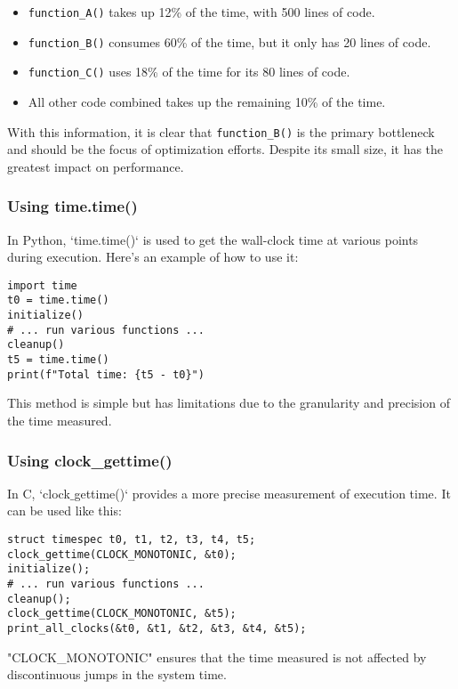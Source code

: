 \documentclass[12pt]{article}
\begin{document}
\begin{itemize}
    \item \texttt{function\_A()} takes up 12\% of the time, with 500 lines of code.
    \item \texttt{function\_B()} consumes 60\% of the time, but it only has 20 lines of code.
    \item \texttt{function\_C()} uses 18\% of the time for its 80 lines of code.
    \item All other code combined takes up the remaining 10\% of the time.
\end{itemize}

With this information, it is clear that \texttt{function\_B()} is the primary bottleneck and should be the focus of optimization efforts. Despite its small size, it has the greatest impact on performance.


\subsubsection{Using time.time()}
In Python, `time.time()` is used to get the wall-clock time at various points during execution. Here's an example of how to use it:

\begin{verbatim}
import time
t0 = time.time()
initialize()
# ... run various functions ...
cleanup()
t5 = time.time()
print(f"Total time: {t5 - t0}")
\end{verbatim}

This method is simple but has limitations due to the granularity and precision of the time measured.


\subsubsection{Using clock\_gettime()}
In C, `clock$\_$gettime()` provides a more precise measurement of execution time. It can be used like this:

\begin{verbatim}
struct timespec t0, t1, t2, t3, t4, t5;
clock_gettime(CLOCK_MONOTONIC, &t0);
initialize();
# ... run various functions ...
cleanup();
clock_gettime(CLOCK_MONOTONIC, &t5);
print_all_clocks(&t0, &t1, &t2, &t3, &t4, &t5);
\end{verbatim}

"CLOCK\_MONOTONIC" ensures that the time measured is not affected by discontinuous jumps in the system time.
\end{document}
